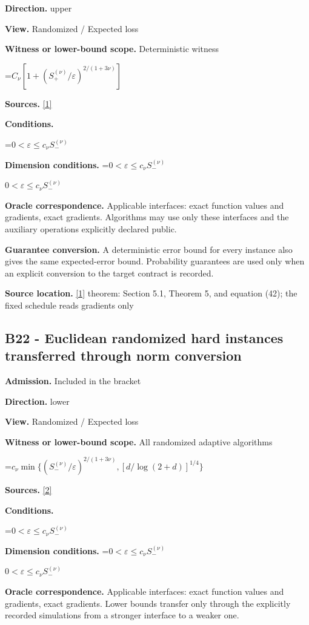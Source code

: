 \documentclass[10pt,a4paper]{article}
\newcommand{\AtlasMath}[1]{\par\begingroup\centering\setbox0=\hbox{$\displaystyle #1$}\ifdim\wd0>1.4\linewidth\typeout{ATLAS WIDE FORMULA: \the\wd0}\fi\ifdim\wd0>\linewidth\resizebox{\linewidth}{!}{\box0}\else\box0\fi\par\endgroup}
\newcommand{\AtlasInlineMath}[1]{\begingroup\setbox0=\hbox{$#1$}\ifdim\wd0>.4\linewidth\endgroup\AtlasMath{#1}\else\endgroup$#1$\fi}
\begin{document}
\textbf{Direction.} upper

\textbf{View.} Randomized / Expected loss

\textbf{Witness or lower-bound scope.} Deterministic witness

\AtlasMath{C_\nu[1+(S_+^{(\nu)}/\varepsilon)^{2/(1+3\nu)}]}
\textbf{Sources.} \href{https://optimization-online.org/wp-content/uploads/2010/12/2865.pdf}{[1]}

\textbf{Conditions.} 
\AtlasMath{0<\varepsilon\le c_\nu S_-^{(\nu)}}


\textbf{Dimension conditions.} \AtlasInlineMath{0<\varepsilon\le c_\nu S_-^{(\nu)}}

\textbf{Oracle correspondence.} Applicable interfaces: exact function values and gradients, exact gradients. Algorithms may use only these interfaces and the auxiliary operations explicitly declared public.

\textbf{Guarantee conversion.} A deterministic error bound for every instance also gives the same expected-error bound. Probability guarantees are used only when an explicit conversion to the target contract is recorded.

\textbf{Source location.} \href{https://optimization-online.org/wp-content/uploads/2010/12/2865.pdf}{[1]} theorem: Section 5.1, Theorem 5, and equation (42); the fixed schedule reads gradients only

\subsection{B22 - Euclidean randomized hard instances transferred through norm conversion}
\textbf{Admission.} Included in the bracket

\textbf{Direction.} lower

\textbf{View.} Randomized / Expected loss

\textbf{Witness or lower-bound scope.} All randomized adaptive algorithms

\AtlasMath{c_\nu\min\{(S_-^{(\nu)}/\varepsilon)^{2/(1+3\nu)},[d/\log(2+d)]^{1/4}\}}
\textbf{Sources.} \href{https://proceedings.mlr.press/v99/diakonikolas19c/diakonikolas19c.pdf}{[2]}

\textbf{Conditions.} 
\AtlasMath{0<\varepsilon\le c_\nu S_-^{(\nu)}}


\textbf{Dimension conditions.} \AtlasInlineMath{0<\varepsilon\le c_\nu S_-^{(\nu)}}

\textbf{Oracle correspondence.} Applicable interfaces: exact function values and gradients, exact gradients. Lower bounds transfer only through the explicitly recorded simulations from a stronger interface to a weaker one.
\end{document}
